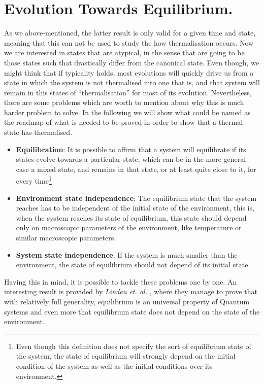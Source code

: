 \section{Evolution Towards Equilibrium.}
As we above-mentioned, the latter result is only valid for a given time and state, meaning that this can not be used to study the how thermalisation occurs. Now we are interested in states that are atypical, in the sense that are going to be those states such that drastically differ from the canonical state. Even though, we might think that if typicality holds, most evolutions will quickly drive us from a state in which the system is not thermalised into one that is, and that system will remain in this states of ``thermalisation'' for most of its evolution. Nevertheless, there are some problems which are worth to mention about why this is much harder problem to solve. In the following we will show what could be named as the roadmap of what is needed to be proved in order to show that a thermal state has thermalised.
\begin{itemize}
\item \textbf{Equilibration}: It is possible to affirm that a system will equilibrate if its states evolve towards a particular state, which can be in the more general case a mixed state, and remains in that state, or at least quite close to it, for every time\footnote{Even though this definition does not specify the sort of equilibrium state of the system, the state of equilibrium will strongly depend on the initial condition of the system as well as the initial conditions over its environment. }
\item \textbf{Environment state independence}: The equilibrium state that the system reaches has to be independent of the initial state of the environment, this is, when the system reaches its state of equilibrium, this state should depend only on macroscopic parameters of the environment, like temperature or similar macroscopic parameters.
\item \textbf{System state independence}: If the system is much smaller than the environment, the state of equilibrium should not depend of its initial state.
\end{itemize}
Having this in mind, it is possible to tackle these problems one by one. An interesting result is provided by \textit{Linden et. al.}  \cite{linden_quantum_2009}, where they manage to prove that with relatively full generality, equilibrium is an universal property of Quantum systems and even more that equilibrium state does not depend on the state of the environment.

